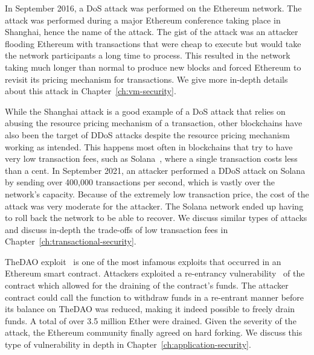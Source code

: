 In September 2016, a DoS attack was performed on the Ethereum network.
The attack was performed during a major Ethereum conference taking place in Shanghai, hence the name of the attack.
The gist of the attack was an attacker flooding Ethereum with transactions that were cheap to execute but would take the network participants a long time to process.
This resulted in the network taking much longer than normal to produce new blocks and forced Ethereum to revisit its pricing mechanism for transactions.
We give more in-depth details about this attack in Chapter~\ref{ch:vm-security}.

While the Shanghai attack is a good example of a DoS attack that relies on abusing the resource pricing mechanism of a transaction, other blockchains have also been the target of DDoS attacks despite the resource pricing mechanism working as intended.
This happens most often in blockchains that try to have very low transaction fees, such as Solana~\cite{solana}, where a single transaction costs less than a cent.
In September 2021, an attacker performed a DDoS attack on Solana by sending over 400,000 transactions per second, which is vastly over the network's capacity.
Because of the extremely low transaction price, the cost of the attack was very moderate for the attacker.
The Solana network ended up having to roll back the network to be able to recover.
We discuss similar types of attacks and discuss in-depth the trade-offs of low transaction fees in Chapter~\ref{ch:transactional-security}.

TheDAO exploit~\cite{Securities2017} is one of the most infamous exploits that occurred in an Ethereum smart contract.
Attackers exploited a re-entrancy vulnerability~\cite{Atzei2017} of the contract which allowed for the draining of the contract's funds.
The attacker contract could call the function to withdraw funds in a re-entrant manner before its balance on TheDAO was reduced, making it indeed possible to freely drain funds.
A total of over 3.5 million Ether were drained.
Given the severity of the attack, the Ethereum community finally agreed on hard forking.
We discuss this type of vulnerability in depth in Chapter~\ref{ch:application-security}.

